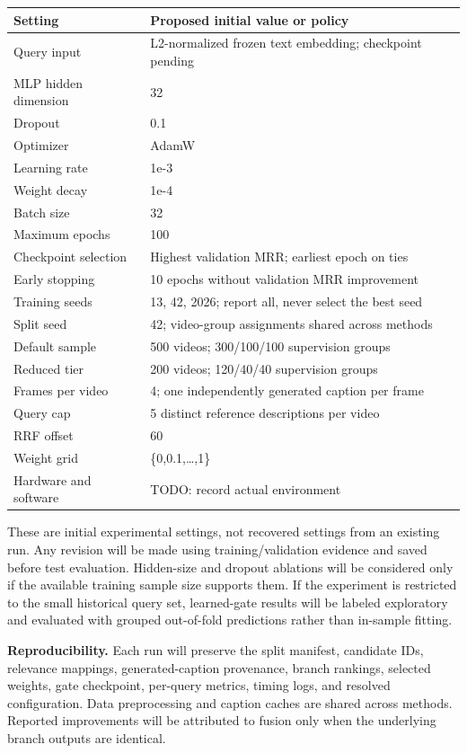 \begin{center}
\small
\begin{tabularx}{\textwidth}{@{}XX@{}}
\toprule
Setting & Proposed initial value or policy \\
\midrule
Query input & L2-normalized frozen text embedding; checkpoint pending \\
MLP hidden dimension & 32 \\
Dropout & 0.1 \\
Optimizer & AdamW \\
Learning rate & 1e-3 \\
Weight decay & 1e-4 \\
Batch size & 32 \\
Maximum epochs & 100 \\
Checkpoint selection & Highest validation MRR; earliest epoch on ties \\
Early stopping & 10 epochs without validation MRR improvement \\
Training seeds & 13, 42, 2026; report all, never select the best seed \\
Split seed & 42; video-group assignments shared across methods \\
Default sample & 500 videos; 300/100/100 supervision groups \\
Reduced tier & 200 videos; 120/40/40 supervision groups \\
Frames per video & 4; one independently generated caption per frame \\
Query cap & 5 distinct reference descriptions per video \\
RRF offset & 60 \\
Weight grid & \{0,0.1,\ldots{},1\} \\
Hardware and software & TODO: record actual environment \\
\bottomrule
\end{tabularx}
\end{center}

These are initial experimental settings, not recovered settings from an existing run. Any revision will be made using training/validation evidence and saved before test evaluation. Hidden-size and dropout ablations will be considered only if the available training sample size supports them. If the experiment is restricted to the small historical query set, learned-gate results will be labeled exploratory and evaluated with grouped out-of-fold predictions rather than in-sample fitting.

\textbf{Reproducibility.} Each run will preserve the split manifest, candidate IDs, relevance mappings, generated-caption provenance, branch rankings, selected weights, gate checkpoint, per-query metrics, timing logs, and resolved configuration. Data preprocessing and caption caches are shared across methods. Reported improvements will be attributed to fusion only when the underlying branch outputs are identical.

